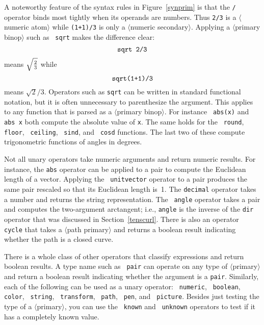 \documentclass{article} %
\newcommand\invisgap{\nobreak\hskip0pt\relax}
\newcommand\tdescr[1]{$\langle$\invisgap#1\invisgap$\rangle$}
\begin{document}
A noteworthy feature of the syntax rules in Figure~\ref{synprim} is that
the {\tt /} operator binds most tightly when its
operands are numbers.  Thus {\tt 2/3} is a \tdescr{numeric
atom}\index{numeric atom?\tdescr{numeric atom}} while {\tt (1+1)/3} is only a \tdescr{numeric
secondary}.  Applying a \tdescr{primary binop} such as {\tt
sqrt}\label{Dsqrt} makes the difference clear:
$$ \hbox{\tt sqrt 2/3} $$
means $\sqrt{2\over3}$ while
$$ \hbox{\tt sqrt(1+1)/3} $$
means $\sqrt 2/3$.  Operators such as {\tt sqrt} can be written in
standard functional notation, but it is often unnecessary to
parenthesize the argument.  This applies to any function that is parsed
as a \tdescr{primary binop}.  For instance {\tt
abs(x)}\label{Dabs} and {\tt abs x} both compute
the absolute value of {\tt x}.  The same holds for the {\tt
round}\label{Dround}, {\tt
floor}\label{Dfloor}, {\tt
ceiling}\label{Dceil}, {\tt
sind}\label{Dsind}, and {\tt
cosd}\label{Dcosd} functions.  The last two of
these compute trigonometric functions of angles in degrees.

Not all unary operators take numeric arguments and return numeric
results.  For instance, the {\tt abs} operator
can be applied to a pair to compute the Euclidean length of a vector.
Applying the {\tt
unitvector}\label{Duvec} operator
to a pair produces the same pair rescaled so that its Euclidean length
is~1.  The {\tt decimal}\label{Ddecop}
operator takes a number and returns the string representation.  The {\tt
angle}\label{Dangle} operator takes a pair
and computes the two-argument arctangent; i.e., {\tt angle} is the
inverse of the {\tt dir} operator that was discussed in
Section~\ref{tenscurl}.  There is also an operator {\tt
cycle}\label{Dcycop} that takes a
\tdescr{path primary} and returns a boolean result indicating whether
the path is a closed curve.

There is a whole class of other operators that classify expressions and
return boolean results.  A type name such as {\tt
pair} can operate on any type of
\tdescr{primary} and return a boolean result indicating whether the
argument is a {\tt pair}\label{Dpairop}.  Similarly, each of the
following can be used as a unary operator: {\tt
numeric}\label{Dnumop}, {\tt
boolean}\label{Dboolop}, {\tt
color}\label{Dcolrop}, {\tt
string}\label{Dstrgop}, {\tt
transform}\label{Dtrnfop}, {\tt
path}\label{Dpathop}, {\tt
pen}\label{Dpenop}, and {\tt
picture}\label{Dpictop}.  Besides just
testing the type of a \tdescr{primary}, you can use the {\tt
known}\label{Dknown} and {\tt
unknown}\label{Dunknwn} operators to
test if it has a completely known value.
\end{document}
